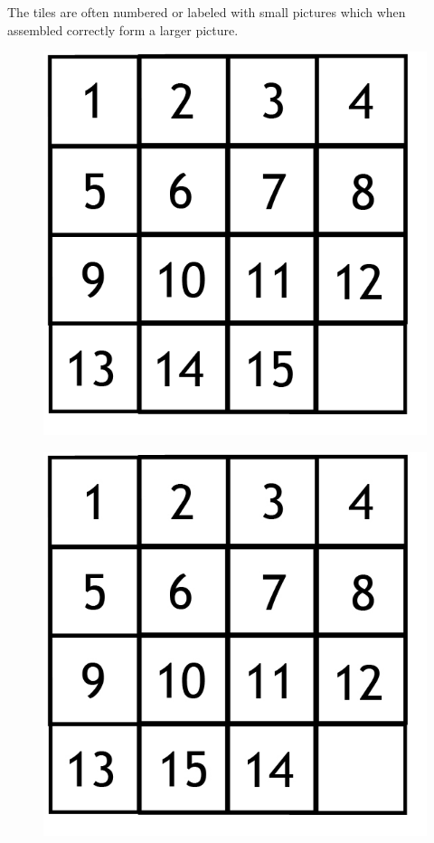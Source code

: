 The tiles are often numbered or labeled with small pictures which when assembled correctly form a larger picture. 
\begin{figure}[!h]
\begin{center}
\includegraphics[scale=0.2]{input/pics/MagicPuzzle.png}
\caption{}
\label{fig:MagicPuzzle}
\end{center}
\end{figure}

\begin{figure}[!h]
\begin{center}
\includegraphics[scale=0.2]{input/pics/MagicPuzzle15-14.jpg}
\caption{}
\label{fig:MagicPuzzleInverse}
\end{center}
\end{figure}

